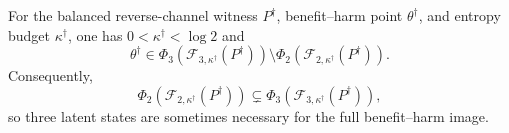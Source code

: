 For the balanced reverse-channel witness \(P^\dagger\), benefit--harm point \(\theta^\dagger\), and entropy budget \(\kappa^\dagger\), one has \(0<\kappa^\dagger<\log2\) and \[\theta^\dagger\in\Phi_3(\mathcal F_{3,\kappa^\dagger}(P^\dagger))\setminus\Phi_2(\mathcal F_{2,\kappa^\dagger}(P^\dagger)).\] Consequently, \[\Phi_2(\mathcal F_{2,\kappa^\dagger}(P^\dagger))\subsetneq\Phi_3(\mathcal F_{3,\kappa^\dagger}(P^\dagger)),\] so three latent states are sometimes necessary for the full benefit--harm image.